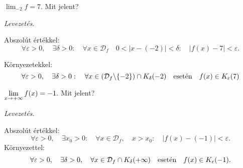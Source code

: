 \documentclass[a4paper,11.5pt]{article}
\begin{document}
		\begin{task}
			$\displaystyle \lim_{-2} f = 7$. Mit jelent?
			
			\textit{Levezetés.} 
			
			Abszolút értékkel:
			\[ \forall \varepsilon>0,\quad \exists \delta>0:\quad \forall x\in\mathcal{D}_f \quad 0<|x-(-2)|<\delta:\quad |f(x)-7|<\varepsilon. \]
			
			Környezetekkel:
			\[ \forall \varepsilon>0,\quad \exists \delta>0:\quad \forall x\in(\mathcal{D}_f\backslash\{-2\})\cap K_\delta(-2) \text{\quad esetén\quad } f(x)\in K_\varepsilon(7) \]
		\end{task}
		\begin{task}
			$\displaystyle\lim_{x\to +\infty} f(x) = -1.$ Mit jelent?
			
			\textit{Levezetés.}
			
			
			Abszolút értékkel:
			\[ \forall \varepsilon>0,\quad \exists x_0>0:\quad \forall x\in\mathcal{D}_f,\quad x>x_0:\quad |f(x)-(-1)|<\varepsilon. \]
			Környezettel:
			\[ \forall\varepsilon>0,\quad \exists\delta>0,\quad \forall x\in\mathcal{D}_f\cap K_\delta(+\infty) \text{\quad esetén\quad } f(x)\in K_\varepsilon(-1). \]
		\end{task}
\end{document}

